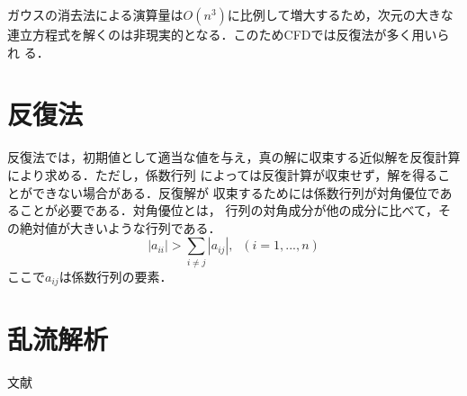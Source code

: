 \documentclass[./Main.tex]{subfiles}
\begin{document}
ガウスの消去法による演算量は$O(n^3)$に比例して増大するため，次元の大きな
連立方程式を解くのは非現実的となる．このためCFDでは反復法が多く用いられ
る．

\section{反復法}
反復法では，初期値として適当な値を与え，真の解に収束する近似解を反復計算により求める．ただし，係数行列
によっては反復計算が収束せず，解を得ることができない場合がある．反復解が
収束するためには係数行列が対角優位であることが必要である．対角優位とは，
行列の対角成分が他の成分に比べて，その絶対値が大きいような行列である．
\begin{equation}
 |a_{ii}|>\sum_{i\neq j}|a_{ij}|, \;\;(i=1,...,n)
\end{equation}
ここで$a_{ij}$は係数行列の要素．

\section{乱流解析}
文献\cite{Kajishima}

\ifSubfilesClassLoaded{


}{}
\end{document}
